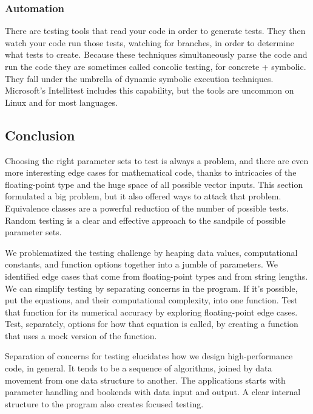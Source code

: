 \documentclass[fleqn,10pt]{olplainarticle}
\begin{document}
\subsubsection{Automation}

There are testing tools that read your code in order to
generate tests. They then watch your code run those tests,
watching for branches, in order to determine what tests
to create. Because these techniques simultaneously parse the
code and run the code they are sometimes called concolic testing,
for concrete + symbolic. They fall under the umbrella of
dynamic symbolic execution techniques. Microsoft's Intellitest
includes this capability, but the tools are uncommon on
Linux and for most languages.


\subsection{Conclusion}

Choosing the right parameter sets to test is always a problem,
and there are even more interesting edge cases for mathematical
code, thanks to intricacies of the floating-point type and 
the huge space of all possible vector inputs. This section
formulated a big problem, but it also offered ways to attack
that problem. Equivalence classes are a powerful reduction of
the number of possible tests. Random testing is a clear and
effective approach to the sandpile of possible parameter sets.

We problematized the testing challenge by heaping data values,
computational constants, and function options together into
a jumble of parameters. We identified edge cases that come from
floating-point types and from string lengths. We can simplify
testing by separating concerns in the program. If it's possible,
put the equations, and their computational complexity, into
one function. Test that function for its numerical accuracy by
exploring floating-point edge cases. Test, separately,
options for how that equation is called, by creating a function
that uses a mock version of the function.

Separation of concerns for testing elucidates how we design
high-performance code, in general. It tends to be a sequence
of algorithms, joined by data movement from one data structure
to another. The applications starts with parameter handling
and bookends with data input and output. A clear internal structure
to the program also creates focused testing.
\end{document}
